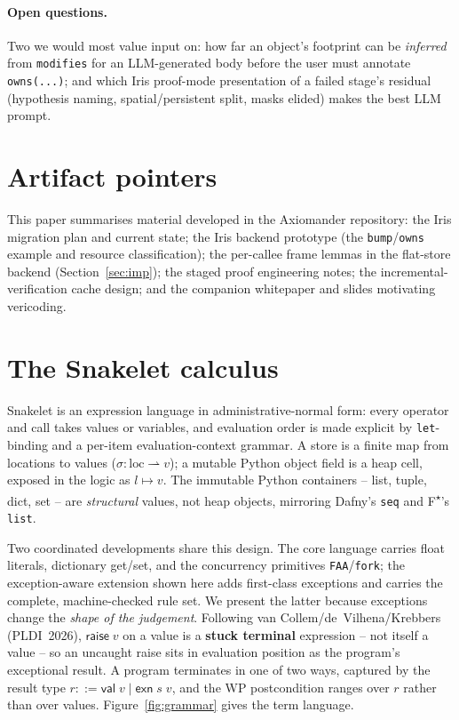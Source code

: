 \documentclass[sigconf,nonacm]{acmart}
\newcommand{\pto}{\mapsto}
\newcommand{\code}[1]{\texttt{#1}}
\begin{document}
\paragraph{Open questions.} Two we would most value input on: how far an object's
footprint can be \emph{inferred} from \code{modifies} for an LLM-generated body
before the user must annotate \code{owns(...)}; and which Iris proof-mode
presentation of a failed stage's residual (hypothesis naming, spatial/persistent
split, masks elided) makes the best LLM prompt.

\section*{Artifact pointers}

This paper summarises material developed in the Axiomander repository: the Iris
migration plan and current state; the Iris backend prototype (the
\code{bump}/\code{owns} example and resource classification); the per-callee frame
lemmas in the flat-store backend (Section~\ref{sec:imp}); the staged proof
engineering notes; the incremental-verification cache design; and the companion
whitepaper and slides motivating vericoding.

\appendix

\section{The Snakelet calculus}
\label{app:snakelet}

Snakelet is an expression language in administrative-normal form: every operator
and call takes values or variables, and evaluation order is made explicit by
\code{let}-binding and a per-item evaluation-context grammar. A store is a finite
map from locations to values ($\sigma : \mathrm{loc} \rightharpoonup v$); a mutable
Python object field is a heap cell, exposed in the logic as $l \pto v$. The
immutable Python containers -- list, tuple, dict, set -- are \emph{structural}
values, not heap objects, mirroring Dafny's \code{seq} and F\textsuperscript{$\star$}'s
\code{list}.

Two coordinated developments share this design. The core language carries float
literals, dictionary get/set, and the concurrency primitives \code{FAA}/\code{fork};
the exception-aware extension shown here adds first-class exceptions and carries
the complete, machine-checked rule set. We present the latter because exceptions
change the \emph{shape of the judgement}. Following van
Collem/de~Vilhena/Krebbers (PLDI~2026), $\mathsf{raise}\;v$ on a value is a
\textbf{stuck terminal} expression -- not itself a value -- so an uncaught raise
sits in evaluation position as the program's exceptional result. A program
terminates in one of two ways, captured by the result type $r ::= \mathsf{val}\;v
\mid \mathsf{exn}\;s\;v$, and the WP postcondition ranges over $r$ rather than
over values. Figure~\ref{fig:grammar} gives the term language.
\end{document}
